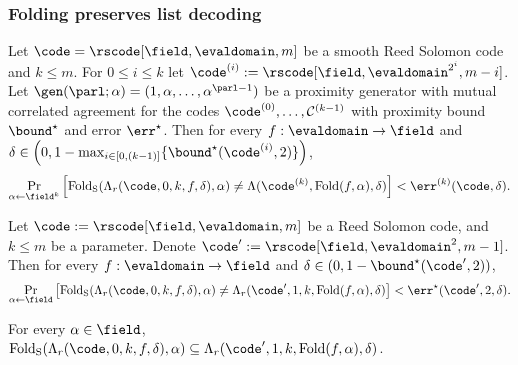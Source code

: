 \subsubsection{Folding preserves list decoding}

\begin{theorem}\label{thm:folding_preserves_listdecoding}
    Let $\code = \rscode[\field, \evaldomain, m]$ be a smooth Reed Solomon code and $k \leq m$. For $0 \leq i \leq k$ let $\code^{(i)} := \rscode[\field, \evaldomain^{2^i}, m - i]$. Let $\gen(\parl; \alpha) = (1, \alpha, \ldots, \alpha^{\parl - 1})$ be a proximity generator with mutual correlated agreement for the codes $\code^{(0)}, \ldots, \mathcal{C}^{(k-1)}$ with proximity bound ${\bound}^\star$ and error $\err^\star$. Then for every $f : \evaldomain \to \field$ and $\delta \in \left(0, 1 - \max_{i \in [0,(k-1)]} \{ {\bound}^\star(\code^{(i)}, 2) \} \right)$,
    \[
    \Pr_{\alpha \leftarrow \field^k} \left[
    \mathrm{Fold_S}(\Lambda_{r}(\code, 0, k, f, \delta), \alpha)
    \neq \Lambda(\code^{(k)}, \mathrm{Fold}(f, \alpha), \delta)
    \right] < \err^{(k)}(\code, \delta).
    \]
\end{theorem}

\begin{lemma}\label{lemma:folding_preserves_listdecoding_base}
    Let $\code := \rscode[\field, \evaldomain, m]$ be a Reed Solomon code, and $k \leq m$ be a parameter. Denote $\code' := \rscode[\field, \evaldomain^{2}, m - 1]$. Then for every $f : \evaldomain \to \field$ and $\delta \in (0, 1 - {\bound}^\star(\code', 2))$,
    \[
    \Pr_{\alpha \leftarrow \field} \left[
    \mathrm{Fold_S}(\Lambda_{r}(\code, 0, k, f, \delta), \alpha)
    \neq \Lambda_{r}(\code', 1, k, \mathrm{Fold}(f, \alpha), \delta)
    \right] < \err^\star(\code', 2, \delta).
    \]
\end{lemma}
    
\begin{lemma}\label{lemma:folding_preserves_listdecoding_bound}
    For every $\alpha \in \field$, $\mathrm{Fold_S}(\Lambda_{r}(\code, 0, k, f, \delta), \alpha) \subseteq \Lambda_{r}(\code', 1, k, \mathrm{Fold}(f, \alpha), \delta)$.
\end{lemma}

